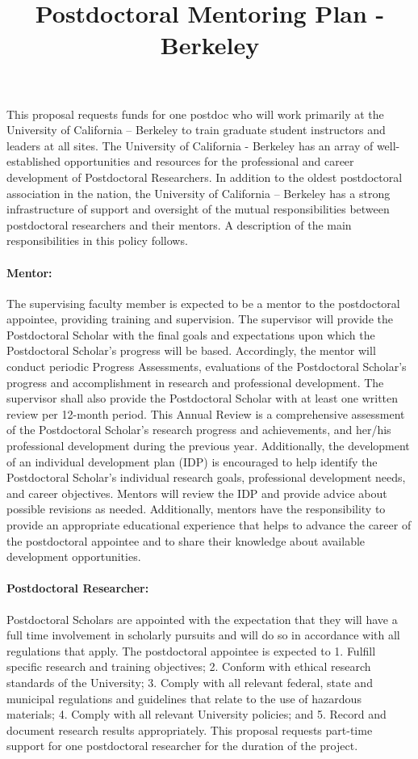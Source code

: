 \documentclass[11pt]{article}
\title{Postdoctoral Mentoring Plan - Berkeley}
\begin{document}
\maketitle
\pagebreak

This proposal requests funds for one postdoc who will work primarily at the
University of California – Berkeley to train graduate student instructors and
leaders at all sites. The University of California - Berkeley has an array of
well-established opportunities and resources for the professional and career
development of Postdoctoral Researchers. In addition to the oldest postdoctoral
association in the nation, the University of California – Berkeley has a strong
infrastructure of support and oversight of the mutual responsibilities between
postdoctoral researchers and their mentors. A description of the main
responsibilities in this policy follows.

\paragraph{Mentor: } The supervising faculty member is expected to be a mentor to the
postdoctoral appointee, providing training and supervision. The supervisor will
provide the Postdoctoral Scholar with the final goals and expectations upon
which the Postdoctoral Scholar’s progress will be based. Accordingly, the
mentor will conduct periodic Progress Assessments, evaluations of the
Postdoctoral Scholar’s progress and accomplishment in research and professional
development.  The supervisor shall also provide the Postdoctoral Scholar with
at least one written review per 12-month period. This Annual Review is a
comprehensive assessment of the Postdoctoral Scholar’s research progress and
achievements, and her/his professional development during the previous year.
Additionally, the development of an individual development plan (IDP) is
encouraged to help identify the Postdoctoral Scholar’s individual research
goals, professional development needs, and career objectives. Mentors will
review the IDP and provide advice about possible revisions as needed.
Additionally, mentors have the responsibility to provide an appropriate
educational experience that helps to advance the career of the postdoctoral
appointee and to share their knowledge about available development
opportunities. 
\paragraph{Postdoctoral Researcher: } Postdoctoral Scholars are appointed with the expectation that they will have a full time involvement in scholarly pursuits and will do so in accordance with all regulations that apply. The postdoctoral appointee is expected to 1. Fulfill specific research and training objectives; 2. Conform with ethical research standards of the University; 3. Comply with all relevant federal, state and municipal regulations and guidelines that relate to the use of hazardous materials; 4. Comply with all relevant University policies; and 5. Record and document research results appropriately. This proposal requests part-time support for one postdoctoral researcher for the duration of the project.  
\end{document}
